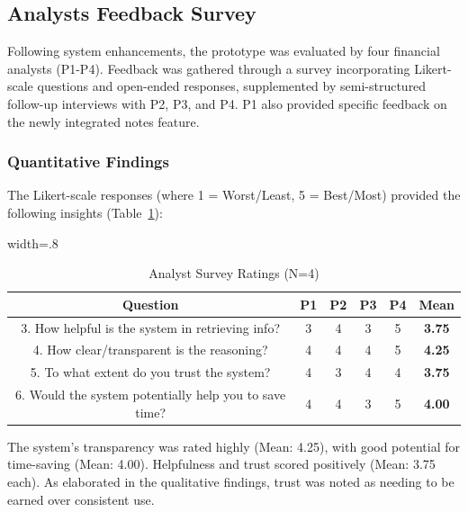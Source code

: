 \documentclass[final,5p,times,twopage,twocolumn,a4paper]{elsarticle}
\begin{document}
\subsection{Analysts Feedback Survey}
Following system enhancements, the prototype was evaluated by four financial analysts (P1-P4). Feedback was gathered through a survey incorporating Likert-scale questions and open-ended responses, supplemented by semi-structured follow-up interviews with P2, P3, and P4. P1 also provided specific feedback on the newly integrated notes feature.

\subsubsection{Quantitative Findings}
The Likert-scale responses (where 1 = Worst/Least, 5 = Best/Most) provided the following insights (Table~\ref{tab:iter2_survey_ratings_detailed}):
%
\begin{table}[!hbt]
\small
\centering
\caption{Analyst Survey Ratings (N=4)}
\label{tab:iter2_survey_ratings_detailed}
\begin{adjustbox}{width=.8\textwidth}
\begin{tabular}{|c|c|c|c|c|c|}
\hline
\textbf{Question}                   & \textbf{P1} & \textbf{P2} & \textbf{P3} & \textbf{P4} & \textbf{Mean} \\ \hline
3. How helpful is the system in retrieving info?  & 3           & 4           & 3           & 5           & \textbf{3.75} \\ \hline
4. How clear/transparent is the reasoning? & 4           & 4           & 4           & 5           & \textbf{4.25} \\ \hline
5. To what extent do you trust the system?     & 4           & 3           & 4           & 4           & \textbf{3.75} \\ \hline
6. Would the system potentially help you to save time?          & 4           & 4           & 3           & 5           & \textbf{4.00} \\ \hline
\end{tabular}
\end{adjustbox}
\end{table}

The system's transparency was rated highly (Mean: 4.25), with good potential for time-saving (Mean: 4.00). Helpfulness and trust scored positively (Mean: 3.75 each). As elaborated in the qualitative findings, trust was noted as needing to be earned over consistent use.
\end{document}

